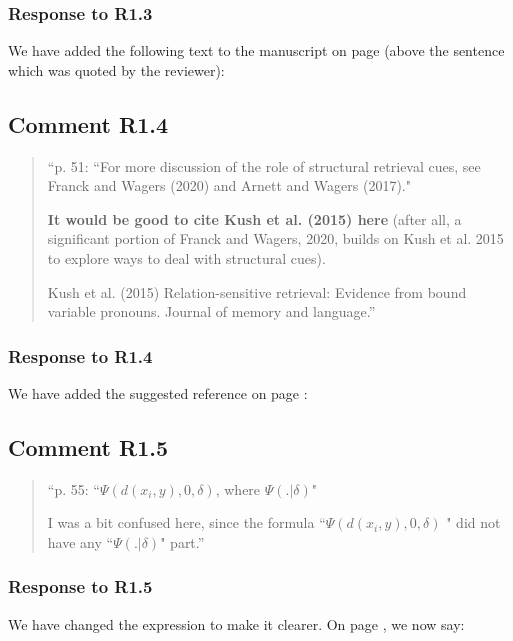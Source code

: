 \documentclass[12pt]{article}
\begin{document}
\subsubsection*{Response to R1.3}
We have added the following text to the manuscript on page \pageref{confound} (above the sentence which was quoted by the reviewer):

\begin{quote}
\end{quote}


\subsection*{Comment R1.4}
\begin{quote}
``p. 51: ``For more discussion of the role of structural retrieval cues, see Franck and Wagers (2020) and Arnett and Wagers (2017)."

\textbf{It would be good to cite Kush et al. (2015) here} (after all, a significant portion of Franck and Wagers, 2020, builds on Kush et al. 2015 to explore ways to deal with structural cues).

Kush et al. (2015) Relation-sensitive retrieval: Evidence from bound variable pronouns. Journal of memory and language.''
\end{quote}
\subsubsection*{Response to R1.4}
We have added the suggested reference on page \pageref{cite_kush}:

\begin{quote}
\end{quote}



\subsection*{Comment R1.5}
\begin{quote}
``p. 55: ``$\Psi(d(x_i, y), 0 , \delta)$, where $\Psi(.|\delta)$"

I was a bit confused here, since the formula  ``$\Psi(d(x_i, y), 0 , \delta)$ " did not have any  ``$\Psi(.|\delta)$" part.''
\end{quote}

\subsubsection*{Response to R1.5}
We have changed the expression to make it clearer. On page \pageref{modeling}, we now say:
\end{document}
